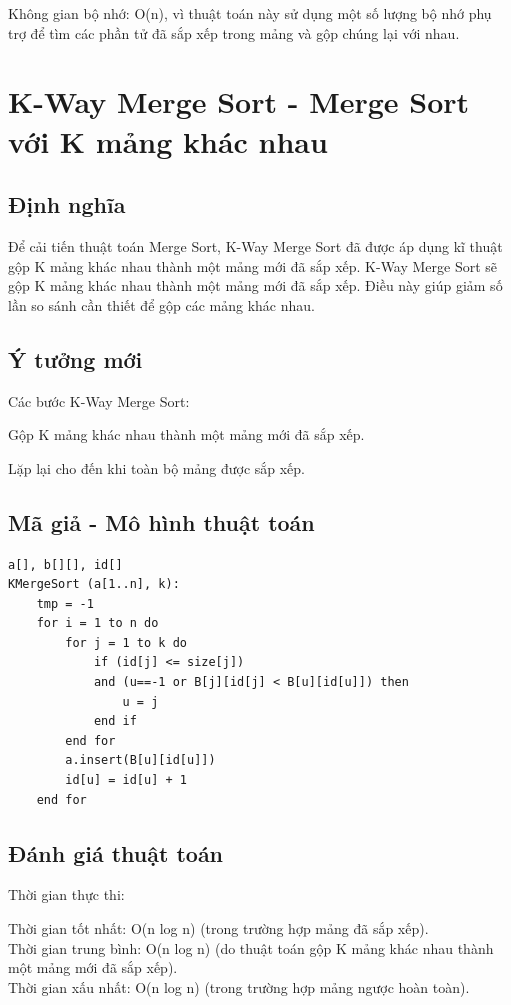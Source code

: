 \documentclass[12pt,a4paper]{report}
\begin{document}
{Không gian bộ nhớ: O(n), vì thuật toán này sử dụng một số lượng bộ nhớ phụ trợ để tìm các phần tử đã sắp xếp trong mảng và gộp chúng lại với nhau.}

\section{ K-Way Merge Sort - Merge Sort với K mảng khác nhau}
 
\subsection{ Định nghĩa}

{\large \hspace{1cm} Để cải tiến thuật toán Merge Sort, K-Way Merge Sort đã được áp dụng kĩ thuật gộp K mảng khác nhau thành một mảng mới đã sắp xếp. K-Way Merge Sort sẽ gộp K mảng khác nhau thành một mảng mới đã sắp xếp. Điều này giúp giảm số lần so sánh cần thiết để gộp các mảng khác nhau. }

\subsection {Ý tưởng mới}

Các bước K-Way Merge Sort:

Gộp K mảng khác nhau thành một mảng mới đã sắp xếp.

Lặp lại cho đến khi toàn bộ mảng được sắp xếp.

\subsection{ Mã giả - Mô hình thuật toán}

\begin{lstlisting}
a[], b[][], id[]
KMergeSort (a[1..n], k):
    tmp = -1
    for i = 1 to n do 
        for j = 1 to k do 
            if (id[j] <= size[j]) 
            and (u==-1 or B[j][id[j] < B[u][id[u]]) then
                u = j
            end if
        end for
        a.insert(B[u][id[u]])
        id[u] = id[u] + 1
    end for
\end{lstlisting}

\subsection{ Đánh giá thuật toán}

{Thời gian thực thi:

\hspace{0.5cm} Thời gian tốt nhất: O(n log n) (trong trường hợp mảng đã sắp xếp).\\

\hspace{0.5cm} Thời gian trung bình: O(n log n) (do thuật toán gộp K mảng khác nhau thành một mảng mới đã sắp xếp).\\

\hspace{0.5cm} Thời gian xấu nhất: O(n log n) (trong trường hợp mảng ngược hoàn toàn).\\}
\end{document}
